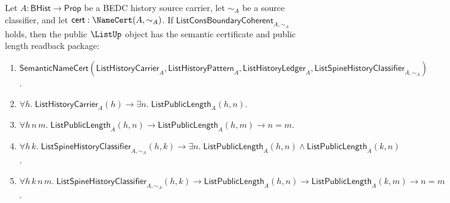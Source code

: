 \begin{theorem}
\label{thm:list-public-object-certificate-with-length-readback}
Let $A:\mathsf{BHist}\to\mathsf{Prop}$ be a BEDC history source carrier, let
$\sim_A$ be a source classifier, and let
$\mathsf{cert}:\NameCert(A,\sim_A)$. If
$\mathsf{ListConsBoundaryCoherent}_{A,\sim_A}$ holds, then the public
$\ListUp$ object has the semantic certificate and public length readback package:
\begin{enumerate}
  \item
  $\mathsf{SemanticNameCert}(\mathsf{ListHistoryCarrier}_A,
  \mathsf{ListHistoryPattern}_A,
  \mathsf{ListHistoryLedger}_A,
  \mathsf{ListSpineHistoryClassifier}_{A,\sim_A})$.
  \item
  $\forall h.\;\mathsf{ListHistoryCarrier}_A(h)\to
  \exists n.\;\mathsf{ListPublicLength}_A(h,n)$.
  \item
  $\forall h\,n\,m.\;\mathsf{ListPublicLength}_A(h,n)\to
  \mathsf{ListPublicLength}_A(h,m)\to n=m$.
  \item
  $\forall h\,k.\;\mathsf{ListSpineHistoryClassifier}_{A,\sim_A}(h,k)\to
  \exists n.\;\mathsf{ListPublicLength}_A(h,n)\land
  \mathsf{ListPublicLength}_A(k,n)$.
  \item
  $\forall h\,k\,n\,m.\;
  \mathsf{ListSpineHistoryClassifier}_{A,\sim_A}(h,k)\to
  \mathsf{ListPublicLength}_A(h,n)\to
  \mathsf{ListPublicLength}_A(k,m)\to n=m$.
\end{enumerate}
\end{theorem}
